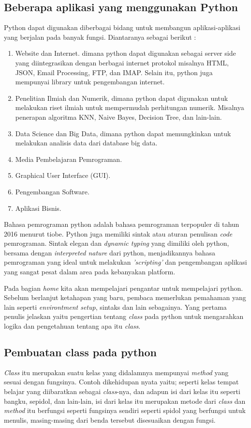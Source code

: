 \subsection{Beberapa aplikasi yang menggunakan Python}
Python dapat digunakan diberbagai bidang untuk membangun aplikasi-aplikasi yang berjalan pada banyak fungsi. Diantaranya sebagai berikut :
\begin{enumerate}
\item Website dan Internet. dimana python dapat digunakan sebagai server side yang diintegrasikan dengan berbagai internet protokol misalnya HTML, JSON, Email Processing, FTP, dan IMAP. Selain itu, python juga mempunyai library untuk pengembangan internet.
\item Penelitian Ilmiah dan Numerik, dimana python dapat digunakan untuk melakukan riset ilmiah untuk mempermudah perhitungan numerik. Misalnya penerapan algoritma KNN, Naive Bayes, Decision Tree, dan lain-lain.
\item Data Science dan Big Data, dimana python dapat memungkinkan untuk melakukan analisis data dari database big data.
\item Media Pembelajaran Pemrograman.
\item Graphical User Interface (GUI).
\item Pengembangan Software.
\item Aplikasi Bisnis.
\end{enumerate}

Bahasa pemrograman python adalah bahasa pemrograman terpopuler di tahun 2016 menurut tiobe\cite{https://www.tiobe.com/tiobe-index/}. Python juga memiliki sintak atau aturan penulisan \textit{code} pemrograman. Sintak elegan dan \textit{dynamic typing} yang dimiliki oleh python, bersama dengan \textit{interpreted nature} dari python, menjadikannya bahasa pemrograman yang ideal untuk melakukan \textit{'scripting'} dan pengembangan aplikasi yang sangat pesat dalam area pada kebanyakan platform.

Pada bagian \textit{home} kita akan mempelajari pengantar untuk mempelajari python. Sebelum berlanjut ketahapan yang baru, pembaca memerlukan pemahaman yang lain seperti \textit{environtment setup}, sintaks dan lain sebagainya. Yang pertama penulis jelaskan yaitu pengertian tentang \textit{class} pada python untuk mengarahkan logika dan pengetahuan tentang apa itu \textit{class}.

\subsection{Pembuatan class pada python}
\textit{Class} itu merupakan suatu kelas yang didalamnya mempunyai \textit{method} yang sesuai dengan fungsinya. Contoh dikehidupan nyata yaitu; seperti kelas tempat belajar yang diibaratkan sebagai \textit{class}-nya, dan adapun isi dari kelas itu seperti bangku, sepidol, dan lain-lain, isi dari kelas itu merupakan metode dari \textit{class} dan \textit{method} itu berfungsi seperti fungsinya sendiri seperti spidol yang berfungsi untuk menulis, masing-masing dari benda tersebut disesuaikan dengan fungsi.

